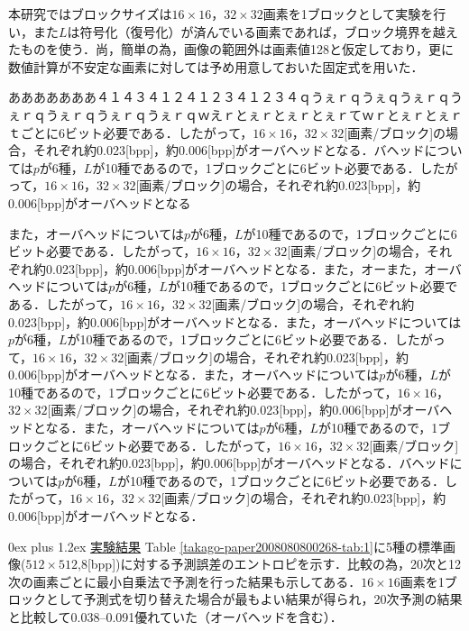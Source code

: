 \documentclass[9pt,dvipdfmx]{jsarticle}
\makeatletter
\def\section{\@startsection {section}{1}{\z@}
{1ex plus -1ex minus-.2ex}%
{0ex plus 1.2ex}%
 {\normalsize\bf}%
 }
\makeatother
\begin{document}
本研究ではブロックサイズは$16\times16$，$32\times32$画素を1ブロックとして実験を行い，また$L$は符号化（復号化）が済んでいる画素であれば，ブロック境界を越えたものを使う．尚，簡単の為，画像の範囲外は画素値128と仮定しており，更に数値計算が不安定な画素に対しては予め用意しておいた固定式を用いた．

あああああああ４１４３４１２４１２３４１２３４ｑうぇｒｑうぇｑうぇｒｑうぇｒｑうぇｒｑうぇｒｑうぇｒｑｗえｒとぇｒとぇｒとぇｒてｗｒとぇｒとぇｒｔごとに6ビット必要である．したがって，$16\times 16$，$32\times 32$[画素/ブロック]の場合，それぞれ約0.023[bpp]，約0.006[bpp]がオーバヘッドとなる．バヘッドについては$p$が6種，$L$が10種であるので，1ブロックごとに6ビット必要である．したがって，$16\times 16$，$32\times 32$[画素/ブロック]の場合，それぞれ約0.023[bpp]，約0.006[bpp]がオーバヘッドとなる

また，オーバヘッドについては$p$が6種，$L$が10種であるので，1ブロックごとに6ビット必要である．したがって，$16\times 16$，$32\times 32$[画素/ブロック]の場合，それぞれ約0.023[bpp]，約0.006[bpp]がオーバヘッドとなる．また，オーまた，オーバヘッドについては$p$が6種，$L$が10種であるので，1ブロックごとに6ビット必要である．したがって，$16\times 16$，$32\times 32$[画素/ブロック]の場合，それぞれ約0.023[bpp]，約0.006[bpp]がオーバヘッドとなる．また，オーバヘッドについては$p$が6種，$L$が10種であるので，1ブロックごとに6ビット必要である．したがって，$16\times 16$，$32\times 32$[画素/ブロック]の場合，それぞれ約0.023[bpp]，約0.006[bpp]がオーバヘッドとなる．また，オーバヘッドについては$p$が6種，$L$が10種であるので，1ブロックごとに6ビット必要である．したがって，$16\times 16$，$32\times 32$[画素/ブロック]の場合，それぞれ約0.023[bpp]，約0.006[bpp]がオーバヘッドとなる．また，オーバヘッドについては$p$が6種，$L$が10種であるので，1ブロックごとに6ビット必要である．したがって，$16\times 16$，$32\times 32$[画素/ブロック]の場合，それぞれ約0.023[bpp]，約0.006[bpp]がオーバヘッドとなる．バヘッドについては$p$が6種，$L$が10種であるので，1ブロックごとに6ビット必要である．したがって，$16\times 16$，$32\times 32$[画素/ブロック]の場合，それぞれ約0.023[bpp]，約0.006[bpp]がオーバヘッドとなる．

\section{\underline{実験結果}}
Table \ref{takago-paper2008080800268-tab:1}に5種の標準画像($512\times512$,8[bpp])に対する予測誤差のエントロピを示す．比較の為，20次と12次の画素ごとに最小自乗法で予測を行った結果も示してある．$16\times 16$画素を1ブロックとして予測式を切り替えた場合が最もよい結果が得られ，20次予測の結果と比較して0.038--0.091優れていた（オーバヘッドを含む）．
\end{document}
